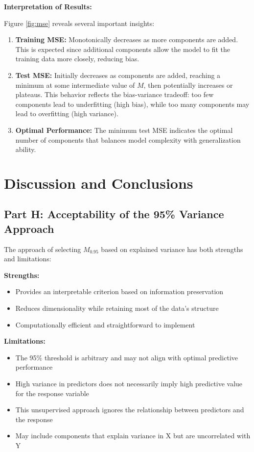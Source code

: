 \documentclass[11pt]{article}
\begin{document}
\textbf{Interpretation of Results:}

Figure \ref{fig:mse} reveals several important insights:

\begin{enumerate}
    \item \textbf{Training MSE:} Monotonically decreases as more components are added. This is expected since additional components allow the model to fit the training data more closely, reducing bias.
    
    \item \textbf{Test MSE:} Initially decreases as components are added, reaching a minimum at some intermediate value of $M$, then potentially increases or plateaus. This behavior reflects the bias-variance tradeoff: too few components lead to underfitting (high bias), while too many components may lead to overfitting (high variance).
    
    \item \textbf{Optimal Performance:} The minimum test MSE indicates the optimal number of components that balances model complexity with generalization ability.
\end{enumerate}

\section{Discussion and Conclusions}

\subsection{Part H: Acceptability of the 95\% Variance Approach}
The approach of selecting $M_{0.95}$ based on explained variance has both strengths and limitations:

\textbf{Strengths:}
\begin{itemize}
    \item Provides an interpretable criterion based on information preservation
    \item Reduces dimensionality while retaining most of the data's structure
    \item Computationally efficient and straightforward to implement
\end{itemize}

\textbf{Limitations:}
\begin{itemize}
    \item The 95\% threshold is arbitrary and may not align with optimal predictive performance
    \item High variance in predictors does not necessarily imply high predictive value for the response variable
    \item This unsupervised approach ignores the relationship between predictors and the response
    \item May include components that explain variance in X but are uncorrelated with Y
\end{itemize}
\end{document}
